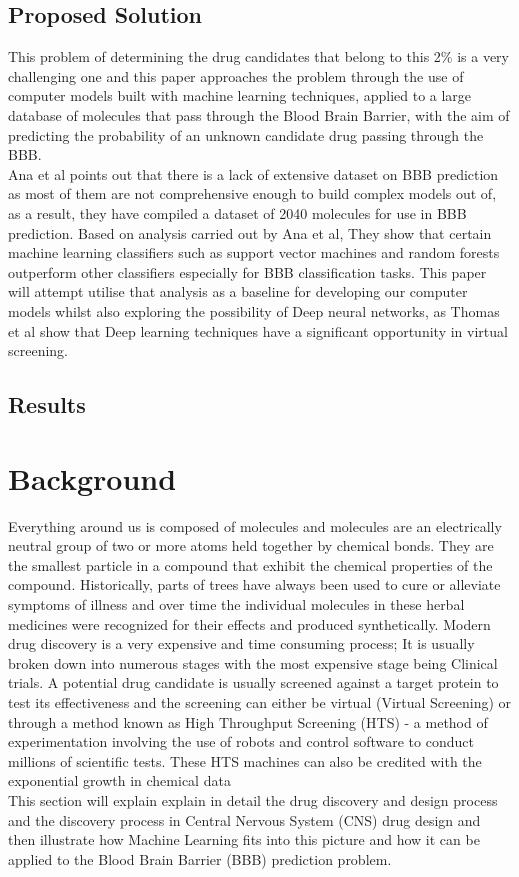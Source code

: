 \documentclass[a4paper,12pt]{report}
\begin{document}
	\section{Proposed Solution}
		This problem of determining the drug candidates that belong to this 2\% is a very challenging one and this paper approaches the problem through the use of computer models built with machine learning techniques, applied to a large database of molecules that pass through the Blood Brain Barrier, with the aim of predicting the probability of an unknown candidate drug passing through the BBB. \\
		Ana et al \cite{Anaetal2012} points out that there is a lack of extensive dataset on BBB prediction as most of them are not comprehensive enough to build complex models out of, as a result, they have compiled a dataset of 2040 molecules for use in BBB prediction. Based on analysis carried out \cite{Anaetal2012} by Ana et al, They show that certain machine learning classifiers such as support vector machines and random forests outperform other classifiers especially for BBB classification tasks. This paper will attempt utilise that analysis as a baseline for developing our computer models whilst also exploring the possibility of Deep neural networks, as Thomas et al \cite{Thomasetal2014} show that Deep learning techniques have a significant opportunity in virtual screening.
	\section{Results}


\chapter{Background}
	Everything around us is composed of molecules and molecules are an electrically neutral group of two or more atoms held together by chemical bonds. They are the smallest particle in a compound that exhibit the chemical properties of the compound. 
	Historically, parts of trees have always been used to cure or alleviate symptoms of illness and over time the individual molecules in these herbal medicines were recognized for their effects and produced synthetically. Modern drug discovery is a very expensive and time consuming process; It is usually broken down into numerous stages with the most expensive stage being Clinical trials. A potential drug candidate is usually screened against a target protein to test its effectiveness and the screening can either be virtual (Virtual Screening) or through a method known as High Throughput Screening (HTS) - a method of experimentation involving the use of robots and control software to conduct millions of scientific tests. These HTS machines can also be credited with the exponential growth in chemical data  \cite{Dougetal2008}
	\\
	This section will explain explain in detail the drug discovery and design process and the discovery process in Central Nervous System (CNS) drug design and then illustrate how Machine Learning fits into this picture and how it can be applied to the Blood Brain Barrier (BBB) prediction problem.
	
\end{document}
